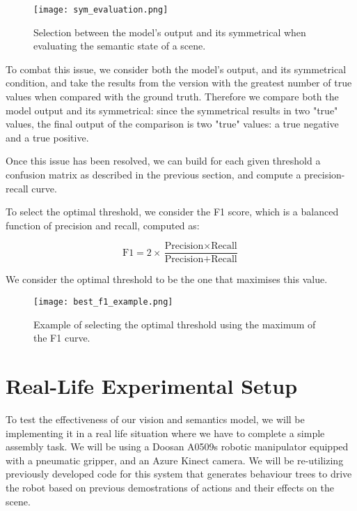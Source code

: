 \begin{figure}[ht]
    \texttt{[image: sym\_evaluation.png]}
    \caption{Selection between the model's output and its symmetrical when evaluating the semantic state of a scene.}
    \label{sym_eval}
\end{figure}

To combat this issue, we consider both the model's output, and its symmetrical condition, and take the results from the version with the greatest number of true values when compared with the ground truth. Therefore we compare both the model output and its symmetrical: since the symmetrical results in two "true" values, the final output of the comparison is two "true" values: a true negative and a true positive.

Once this issue has been resolved, we can build for each given threshold a confusion matrix as described in the previous section, and compute a precision-recall curve.

To select the optimal threshold, we consider the F1 score, which is a balanced function of precision and recall, computed as:

\begin{equation*}
    \text{F1} = 2\times\frac{\text{Precision}\times\text{Recall}}{\text{Precision}+\text{Recall}}
\end{equation*}

We consider the optimal threshold to be the one that maximises this value.

\begin{figure}[ht]
    \texttt{[image: best\_f1\_example.png]}
    \caption{Example of selecting the optimal threshold using the maximum of the F1 curve.}
\end{figure}

\section{Real-Life Experimental Setup}

To test the effectiveness of our vision and semantics model, we will be implementing it in a real life situation where we have to complete a simple assembly task. We will be using a Doosan A0509s robotic manipulator equipped with a pneumatic gripper, and an Azure Kinect camera. We will be re-utilizing previously developed code for this system that generates behaviour trees \cite{behavior_tree} to drive the robot based on previous demostrations of actions and their effects on the scene.

